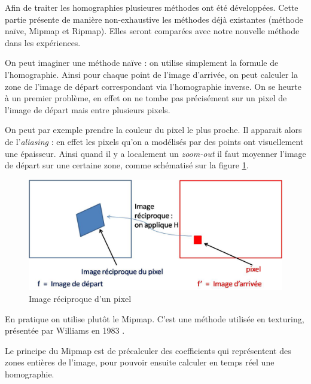   Afin de traiter les homographies plusieures méthodes ont été développées. Cette partie présente de manière non-exhaustive les méthodes déjà existantes (méthode naïve, Mipmap et Ripmap). Elles seront comparées avec notre nouvelle méthode dans les expériences.



On peut imaginer une méthode naïve : on utilise simplement la formule de l'homographie. Ainsi pour chaque point de l'image d'arrivée, on peut calculer la zone de l'image de départ correspondant via l'homographie inverse. On se heurte à un premier problème, en effet on ne tombe pas précisément sur un pixel de l'image de départ mais entre plusieurs pixels. 

On peut par exemple prendre la couleur du pixel le plus proche. Il apparait alors de l'\emph{aliasing} : en effet les pixels qu'on a modélisés par des points ont visuellement une épaisseur. Ainsi quand il y a localement un \emph{zoom-out} il faut moyenner l'image de départ sur une certaine zone, comme schématisé sur la figure \ref{imagereciproque}.


\begin{figure}[h!]
\centering
\includegraphics[scale=0.5]{imagereciproque.jpg}
\caption{Image réciproque d'un pixel}
\label{imagereciproque}
\end{figure}

En pratique on utilise plutôt le Mipmap. C'est une méthode utilisée en texturing, présentée par Williams en 1983 \cite{williams1983pyramidal}.


Le principe du Mipmap est de précalculer des coefficients qui représentent des zones entières de l'image, pour pouvoir ensuite calculer en temps réel une homographie. 


